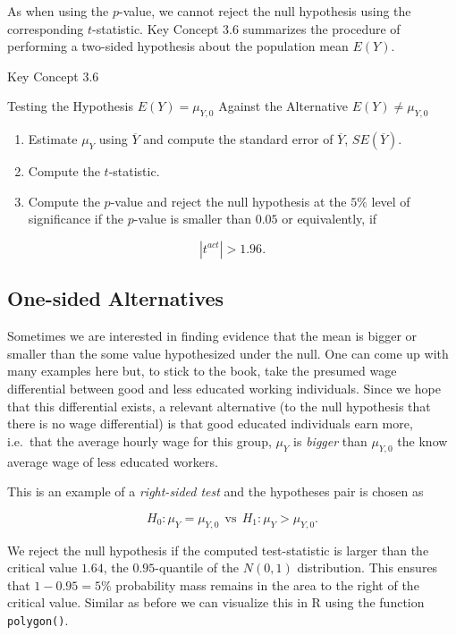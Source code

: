 \documentclass[]{book}
\theoremstyle{definition}
\theoremstyle{definition}
\theoremstyle{definition}
\theoremstyle{remark}
\begin{document}
As when using the \(p\)-value, we cannot reject the null hypothesis
using the corresponding \(t\)-statistic. Key Concept 3.6 summarizes the
procedure of performing a two-sided hypothesis about the population mean
\(E(Y)\).

Key Concept 3.6

Testing the Hypothesis \(E(Y) = \mu_{Y,0}\) Against the Alternative
\(E(Y) \neq \mu_{Y,0}\)

\begin{enumerate}
\def\labelenumi{\arabic{enumi}.}
\item
  Estimate \(\mu_{Y}\) using \(\overline{Y}\) and compute the standard
  error of \(\overline{Y}\), \(SE(\overline{Y})\).
\item
  Compute the \(t\)-statistic.
\item
  Compute the \(p\)-value and reject the null hypothesis at the \(5\%\)
  level of significance if the \(p\)-value is smaller than \(0.05\) or
  equivalently, if
\end{enumerate}

\[ \left\lvert t^{act} \right\rvert > 1.96. \]

\subsection*{One-sided Alternatives}\label{one-sided-alternatives}

Sometimes we are interested in finding evidence that the mean is bigger
or smaller than the some value hypothesized under the null. One can come
up with many examples here but, to stick to the book, take the presumed
wage differential between good and less educated working individuals.
Since we hope that this differential exists, a relevant alternative (to
the null hypothesis that there is no wage differential) is that good
educated individuals earn more, i.e.~that the average hourly wage for
this group, \(\mu_Y\) is \emph{bigger} than \(\mu_{Y,0}\) the know
average wage of less educated workers.

This is an example of a \emph{right-sided test} and the hypotheses pair
is chosen as

\[ H_0: \mu_Y = \mu_{Y,0} \ \ \text{vs} \ \ H_1: \mu_Y > \mu_{Y,0}. \]

We reject the null hypothesis if the computed test-statistic is larger
than the critical value \(1.64\), the \(0.95\)-quantile of the
\(N(0,1)\) distribution. This ensures that \(1-0.95=5\%\) probability
mass remains in the area to the right of the critical value. Similar as
before we can visualize this in R using the function \texttt{polygon()}.
\end{document}
